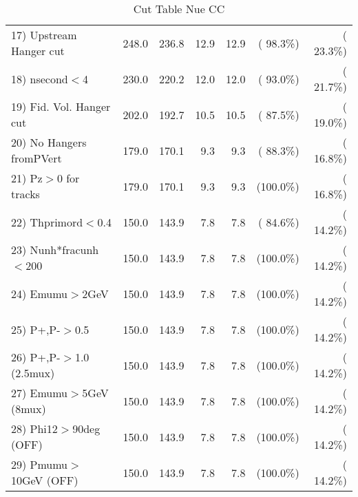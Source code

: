 \begin{table}[h!]
\begin{tabular}{||l||r|r|r|r|r|r||}
 17) Upstream Hanger cut  &        248.0 &        236.8 &         12.9 &         12.9 & ( 98.3\%) & ( 23.3\%) \\
 18) nsecond$<$4          &        230.0 &        220.2 &         12.0 &         12.0 & ( 93.0\%) & ( 21.7\%) \\
 19) Fid. Vol. Hanger cut &        202.0 &        192.7 &         10.5 &         10.5 & ( 87.5\%) & ( 19.0\%) \\
 20) No Hangers fromPVert &        179.0 &        170.1 &          9.3 &          9.3 & ( 88.3\%) & ( 16.8\%) \\
 21) Pz$>$0 for tracks    &        179.0 &        170.1 &          9.3 &          9.3 & (100.0\%) & ( 16.8\%) \\
 22) Thprimord$<$0.4      &        150.0 &        143.9 &          7.8 &          7.8 & ( 84.6\%) & ( 14.2\%) \\
 23) Nunh*fracunh$<$200   &        150.0 &        143.9 &          7.8 &          7.8 & (100.0\%) & ( 14.2\%) \\
 24) Emumu$>$2GeV         &        150.0 &        143.9 &          7.8 &          7.8 & (100.0\%) & ( 14.2\%) \\
 25) P+,P-$>$0.5          &        150.0 &        143.9 &          7.8 &          7.8 & (100.0\%) & ( 14.2\%) \\
 26) P+,P-$>$1.0 (2.5mux) &        150.0 &        143.9 &          7.8 &          7.8 & (100.0\%) & ( 14.2\%) \\
 27) Emumu$>$5GeV  (8mux) &        150.0 &        143.9 &          7.8 &          7.8 & (100.0\%) & ( 14.2\%) \\
 28) Phi12$>$90deg  (OFF) &        150.0 &        143.9 &          7.8 &          7.8 & (100.0\%) & ( 14.2\%) \\
 29) Pmumu$>$10GeV  (OFF) &        150.0 &        143.9 &          7.8 &          7.8 & (100.0\%) & ( 14.2\%) \\
 \hline
 \hline
 \end{tabular}
 \caption{Cut Table   Nue CC  }
 \label{tab-cutcohjpsi-mumu_nuecc}
 \end{table}
